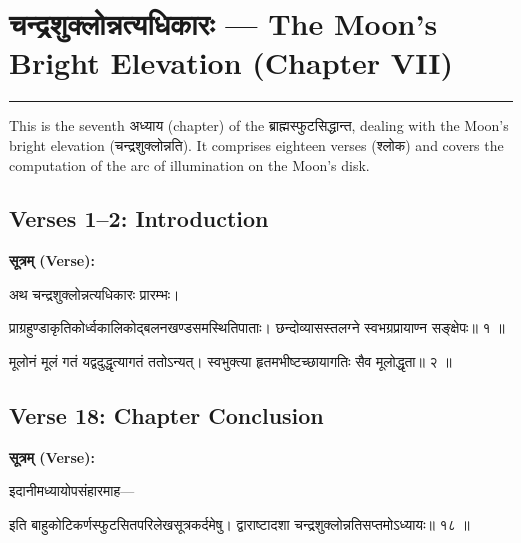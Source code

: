 \documentclass[11pt,a4paper]{article}
\newcommand{\dev}[1]{{\devanagarifont #1}}
\newenvironment{sanskritverse}{%
  \begin{center}\begin{minipage}{0.9\textwidth}
  \setlength{\leftskip}{1em}
  \setlength{\rightskip}{1em}
  \dev
}{\end{minipage}\end{center}}
\begin{document}
\section{\dev{चन्द्रशुक्लोन्नत्यधिकारः} — The Moon's Bright Elevation (Chapter VII)}
\label{sec:chandra-shuklonnati}

\begin{center}
\textcolor{rulecolor}{\rule{0.8\textwidth}{0.5pt}}
\end{center}

This is the seventh \dev{अध्याय} (chapter) of the \dev{ब्राह्मस्फुटसिद्धान्त}, dealing with
the Moon's bright elevation (\dev{चन्द्रशुक्लोन्नति}). It comprises eighteen verses
(\dev{श्लोक}) and covers the computation of the arc of illumination on the
Moon's disk.

\subsection{Verses 1--2: Introduction}

\vspace{0.5em}
\noindent\textbf{\dev{सूत्रम् (Verse):}}
\begin{sanskritverse}
अथ चन्द्रशुक्लोन्नत्यधिकारः प्रारम्भः।
\end{sanskritverse}

\begin{sanskritverse}
प्राग्रहुण्डाकृतिकोर्ध्वकालिकोद्बलनखण्डसमस्थितिपाताः।
छन्दोव्यासस्तलग्ने स्वभग्रप्रायाण्न सङ्क्षेपः॥ १ ॥
\end{sanskritverse}

\begin{sanskritverse}
मूलोनं मूलं गतं यद्वदुद्धृत्यागतं ततोऽन्यत्।
स्वभुक्त्या हृतमभीष्टच्छायागतिः सैव मूलोद्धृता॥ २ ॥
\end{sanskritverse}

\subsection{Verse 18: Chapter Conclusion}

\vspace{0.5em}
\noindent\textbf{\dev{सूत्रम् (Verse):}}
\begin{sanskritverse}
इदानीमध्यायोपसंहारमाह—
\end{sanskritverse}

\begin{sanskritverse}
इति बाहुकोटिकर्णस्फुटसितपरिलेखसूत्रकर्दमेषु।
द्वाराष्टादशा चन्द्रशुक्लोन्नतिसप्तमोऽध्यायः॥ १८ ॥
\end{sanskritverse}
\end{document}
